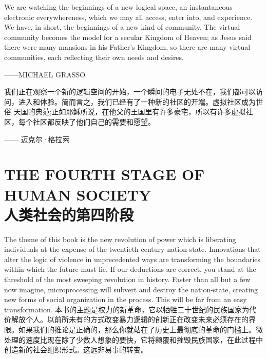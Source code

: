 \begin{paracol}{2}[]
\begin{tcolorbox}
We are watching the beginnings of a new logical space, an instantaneous electronic everywhereness, which we may all access, enter into, and experience. We have, in short, the beginnings of a new kind of community. The virtual community becomes the model for a secular Kingdom of Heaven; as Jesus said there were many mansions in his Father’s Kingdom, so there are many virtual communities, each reflecting their own needs and desires.
\begin{flushright}
——MICHAEL GRASSO
\end{flushright}
\end{tcolorbox}
\switchcolumn
\begin{tcolorbox}
我们正在观察一个新的逻辑空间的开始，一个瞬间的电子无处不在，我们都可以访问，进入和体验。简而言之，我们已经有了一种新的社区的开端。虚拟社区成为世俗
天国的典范;正如耶稣所说，在他父的王国里有许多豪宅，所以有许多虚拟社区，每个社区都反映了他们自己的需要和愿望。
\begin{flushright}
—— 迈克尔·格拉索
\end{flushright}
\end{tcolorbox}
\end{paracol}


\section[人类社会的第四阶段]{THE FOURTH STAGE OF HUMAN SOCIETY \\ 人类社会的第四阶段}
\begin{paracol}{2}[]
The theme of this book is the new revolution of power which is liberating individuals at the expense of the twentieth-century nation-state. Innovations that alter the logic of violence in unprecedented ways are transforming the boundaries within which the future must lie. If our deductions are correct, you stand at the threshold of the most sweeping revolution in history. Faster than all but a few now imagine, microprocessing will subvert and destroy the nation-state, creating new forms of social organization in the process. This will be far from an easy transformation.
\switchcolumn
本书的主题是权力的新革命，它以牺牲二十世纪的民族国家为代价解放个人。以前所未有的方式改变暴力逻辑的创新正在改变未来必须存在的界限。如果我们的推论是正确的，那么你就站在了历史上最彻底的革命的门槛上。微处理的速度比现在除了少数人想象的要快，它将颠覆和摧毁民族国家，在此过程中创造新的社会组织形式。这远非易事的转变。
\end{paracol}

